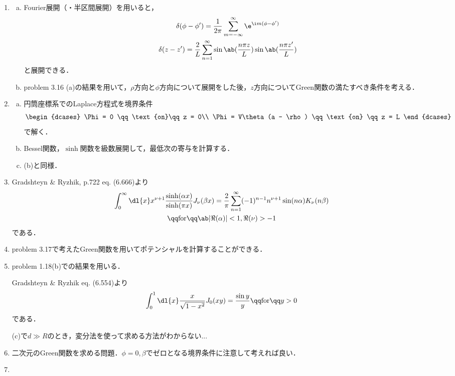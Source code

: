 \begin{enumerate}[%
  label=%
  \fbox{%
   {\thesection.\arabic*}%
    },%
    leftmargin=3\parindent]
  \item %
    \begin{enumerate}[(a)]  
      \item Fourier展開（・半区間展開）を用いると，
        \begin{gather}
          \delta(\phi - \phi') = \frac{1}{2\pi} \sum_{m=-\infty}^{\infty} \e^{\i m (\phi - \phi')}\\
          \delta(z- z') = \frac{2}{L} \sum_{n=1}^\infty \sin\ab(\frac{n\pi z}{L}) \sin\ab(\frac{n \pi z'}{L})
        \end{gather}
        と展開できる．
      \item problem 3.16 (a)の結果を用いて，$\rho$方向と$\phi$方向について展開をした後，$z$方向についてGreen関数の満たすべき条件を考える．
    \end{enumerate}
  \item %
    \begin{enumerate}[(a)]  
      \item  円筒座標系でのLaplace方程式を境界条件
        \begin{gather}
          \begin{dcases}
            \Phi = 0 \qq \text{on}\qq z = 0\\
            \Phi = V\theta(a - \rho) \qq \text{on} \qq z = L
          \end{dcases}
        \end{gather}
        で解く．
      \item Bessel関数，$\sinh$関数を級数展開して，最低次の寄与を計算する．
      \item (b)と同様．
    \end{enumerate}
  \item %
    Gradshteyn \& Ryzhik, p.722 eq. (6.666)より
    \begin{multline}
      \int_0^\infty \dl{x} x^{\nu+1} \frac{\sinh(\alpha x)}{\sinh(\pi x)} J_\nu(\beta x) = \frac{2}{\pi}\sum_{n=1}^\infty (-1)^{n-1} n^{\nu+1} \sin(n \alpha) K_\nu(n \beta)
      \\ \qq \text{for} \qq \ab|\Re(\alpha)| < 1, \Re(\nu) > -1
    \end{multline}
    である．
  \item %
    problem 3.17で考えたGreen関数を用いてポテンシャルを計算することができる．
  \item %
    problem 1.18(b)での結果を用いる．

    Gradshteyn \& Ryzhik eq. (6.554)より
    \begin{gather}  
      \int_0^1 \dl{x} \frac{x}{\sqrt{1-x^2}}J_0(xy) = \frac{\sin y}{y} \qq\text{for}\qq y > 0
    \end{gather}
    である．

    (c)で$d \gg R$のとき，変分法を使って求める方法がわからない...
  \item %
    二次元のGreen関数を求める問題．$\phi = 0, \beta$でゼロとなる境界条件に注意して考えれば良い．
  \item %

\end{enumerate} 



